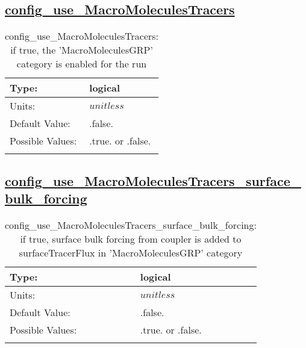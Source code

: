 \subsection[config\_use\_MacroMoleculesTracers]{\hyperref[sec:nm_tab_tracer_forcing_MacroMoleculesTracers]{config\_use\_MacroMoleculesTracers}}
\label{subsec:nm_sec_config_use_MacroMoleculesTracers}
\begin{center}
\begin{longtable}{| p{2.0in} || p{4.0in} |}
    \hline
    Type: & logical \\
    \hline
    Units: & $unitless$ \\
    \hline
    Default Value: & .false. \\
    \hline
    Possible Values: & .true. or .false. \\
    \hline
    \caption{config\_use\_MacroMoleculesTracers: if true, the 'MacroMoleculesGRP' category is enabled for the run}
\end{longtable}
\end{center}
\subsection[config\_use\_MacroMoleculesTracers\_surface\_bulk\_forcing]{\hyperref[sec:nm_tab_tracer_forcing_MacroMoleculesTracers]{config\_use\_MacroMoleculesTracers\_surface\_bulk\_forcing}}
\label{subsec:nm_sec_config_use_MacroMoleculesTracers_surface_bulk_forcing}
\begin{center}
\begin{longtable}{| p{2.0in} || p{4.0in} |}
    \hline
    Type: & logical \\
    \hline
    Units: & $unitless$ \\
    \hline
    Default Value: & .false. \\
    \hline
    Possible Values: & .true. or .false. \\
    \hline
    \caption{config\_use\_MacroMoleculesTracers\_surface\_bulk\_forcing: if true, surface bulk forcing from coupler is added to surfaceTracerFlux in 'MacroMoleculesGRP' category}
\end{longtable}
\end{center}
